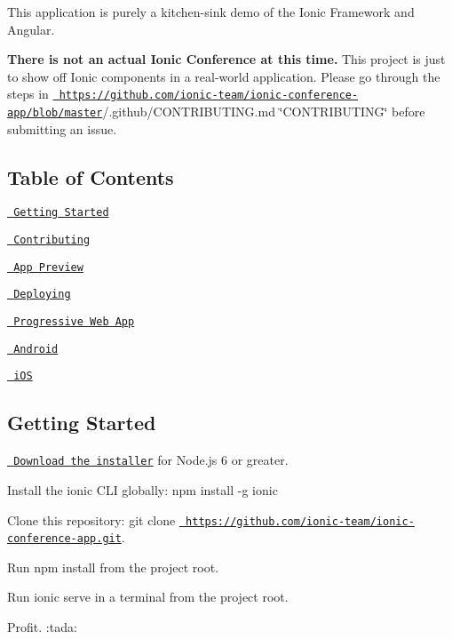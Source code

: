 This application is purely a kitchen-\/sink demo of the Ionic Framework and Angular.

{\bfseries{There is not an actual Ionic Conference at this time.}} This project is just to show off Ionic components in a real-\/world application. Please go through the steps in \href{https://github.com/ionic-team/ionic-conference-app/blob/master}{\texttt{ https\+://github.\+com/ionic-\/team/ionic-\/conference-\/app/blob/master}}/.github/\+C\+O\+N\+T\+R\+I\+B\+U\+T\+I\+N\+G.\+md \char`\"{}\+C\+O\+N\+T\+R\+I\+B\+U\+T\+I\+N\+G\char`\"{} before submitting an issue.

\subsection*{Table of Contents}


\begin{DoxyItemize}
\item \href{\#getting-started}{\texttt{ Getting Started}}
\item \href{\#contributing}{\texttt{ Contributing}}
\item \href{\#app-preview}{\texttt{ App Preview}}
\item \href{\#deploying}{\texttt{ Deploying}}
\begin{DoxyItemize}
\item \href{\#progressive-web-app}{\texttt{ Progressive Web App}}
\item \href{\#android}{\texttt{ Android}}
\item \href{\#ios}{\texttt{ i\+OS}}
\end{DoxyItemize}
\end{DoxyItemize}

\subsection*{Getting Started}


\begin{DoxyItemize}
\item \href{https://nodejs.org/}{\texttt{ Download the installer}} for Node.\+js 6 or greater.
\item Install the ionic C\+LI globally\+: {\ttfamily npm install -\/g ionic}
\item Clone this repository\+: {\ttfamily git clone \href{https://github.com/ionic-team/ionic-conference-app.git}{\texttt{ https\+://github.\+com/ionic-\/team/ionic-\/conference-\/app.\+git}}}.
\item Run {\ttfamily npm install} from the project root.
\item Run {\ttfamily ionic serve} in a terminal from the project root.
\item Profit. \+:tada\+:
\end{DoxyItemize}


